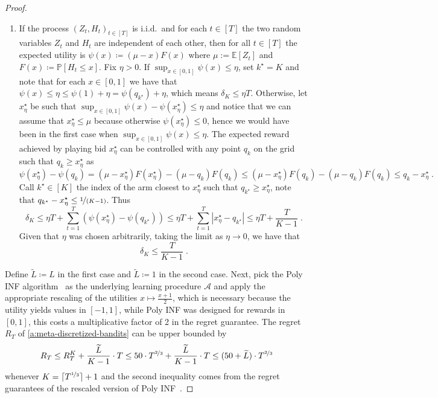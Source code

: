\documentclass[final,12pt]{colt2025}
\newcommand{\cA}{\mathcal{A}}
\newcommand{\Pb}{\mathbb{P}}
\newcommand{\lrb}[1]{\left(#1\right)}
\newcommand{\nV}{Z}
\newcommand{\nM}{H}
\renewcommand{\tilde}{\widetilde}
\begin{document}
\begin{proof}
\begin{enumerate}
    \item If the process $(\nV_t,\nM_t)_{t \in [T]}$ is i.i.d.\ and for each $t \in [T]$ the two random variables $ \nV_t$ and $ \nM_t$ are independent of each other, then for all $t \in [T]$ the expected utility is $\psi(x) \coloneqq (\mu - x)F(x)$ where $\mu := \mathbb{E}[\nV_t]$ and $F(x) \coloneqq \Pb[\nM_t \leq x]$.
    Fix $\eta>0$.
    If $\sup_{x \in [0,1]}\psi(x) \le \eta$, set $k^\star = K$ and note that for each $x \in [0,1]$ we have that $\psi (x) \le \eta \le \psi(1) + \eta = \psi(q_{k^\star}) + \eta$, which means $\delta_K\leq\eta T$.
    Otherwise, let $x^\star_\eta$ be such that $\sup_{x \in [0,1]}\psi(x) - \psi(x^\star_\eta) \le \eta$ and notice that we can assume that $x^\star_\eta \le \mu$ because otherwise $\psi(x^\star_\eta) \le 0$, hence we would have been in the first case when $\sup_{x \in [0,1]}\psi(x) \le \eta$.
    The expected reward achieved by playing bid $x^\star_\eta$ can be controlled with any point $q_k$ on the grid such that $q_k \ge x^\star_\eta$ as
   \[
        \psi(x^\star_\eta) - \psi(q_k)
        = (\mu - x^\star_\eta)F(x_\eta^\star) - (\mu - q_k)F(q_k)
        \le (\mu - x^\star_\eta)F(q_k) - (\mu - q_k)F(q_k)
        \le q_k - x^\star_\eta
    \; .
    \]
    Call $k^\star \in [K]$ the index of the arm closest to $x_\eta^\star$ such that $q_{k^\star} \ge x^\star_\eta$, note that $q_{k^\star} - x^\star_\eta \le \nicefrac{1}{(K-1)}$. Thus
    \[
        \delta_K
    \le
        \eta T + \sum_{t=1}^T \lrb{ \psi(x^\star_\eta) - \psi(q_{k^\star}) }
    \le
        \eta T + \sum_{t=1}^T |x^\star_\eta - q_{k^\star}|
    \le
        \eta T + \frac{T}{K-1}\;.
    \]
    Given that $\eta$ was chosen arbitrarily, taking the limit as $\eta \rightarrow 0$, we have that
    \[
        \delta_K \le \frac{T}{K-1}\;.
    \]
\end{enumerate}
Define $\tilde L \coloneqq L$ in the first case and $\tilde L \coloneqq 1$ in the second case.
 Next, pick the Poly INF algorithm~\citep{audibert10a} as the underlying learning procedure $\cA$ and apply the appropriate rescaling of the utilities $x \mapsto \frac{x+1}{2}$, which is necessary because the utility yields values in $[-1, 1]$, while Poly INF was designed for rewards in $[0, 1]$, this costs a multiplicative factor of 2 in the regret guarantee.
The regret $R_T$ of \cref{a:meta-discretized-bandits} can be upper bounded by
\[
    R_T
    \le R^K_T + \frac{\tilde L}{K - 1} \cdot T
    \le 50 \cdot T^{\nicefrac{2}{3}} + \frac{\tilde L}{K - 1} \cdot T
    \le (50 + \tilde L) \cdot T^{\nicefrac{2}{3}}
\]
whenever $K = \lceil T^{\nicefrac{1}{3}} \rceil + 1$ and the second inequality comes from the regret guarantees of the rescaled version of Poly INF~\cite[Theorem 11]{audibert10a}.
\end{proof}
\end{document}
